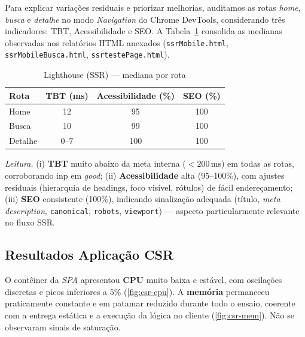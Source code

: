 {Para explicar variações residuais e priorizar melhorias, auditamos as rotas \emph{home}, \emph{busca} e \emph{detalhe} no modo \emph{Navigation} do Chrome DevTools, considerando três indicadores: TBT, Acessibilidade e SEO. A Tabela~\ref{tab:lh-ssr} consolida as medianas observadas nos relatórios HTML anexados (\texttt{ssrMobile.html}, \texttt{ssrMobileBusca.html}, \texttt{ssrtestePage.html}).

\begin{table}[H]
\centering
\caption{Lighthouse (SSR) — mediana por rota}
\label{tab:lh-ssr}
\begin{tabular}{|l|c|c|c|}
\hline
\textbf{Rota} & \textbf{TBT (ms)} & \textbf{Acessibilidade (\%)} & \textbf{SEO (\%)} \\
\hline
Home    & 12 & 95  & 100 \\
Busca   & 10 & 99  & 100 \\
Detalhe & 0--7\footnotemark[1] & 100 & 100 \\
\hline
\end{tabular}
\end{table}

\noindent \textit{Leitura.}
(i) \textbf{TBT} muito abaixo da meta interna ($<200$\,ms) em todas as rotas, corroborando \acrshort{inp} em \textit{good};
(ii) \textbf{Acessibilidade} alta (95--100\%), com ajustes residuais (hierarquia de headings, foco visível, rótulos) de fácil endereçamento;
(iii) \textbf{SEO} consistente (100\%), indicando sinalização adequada (título, \emph{meta description}, \texttt{canonical}, \texttt{robots}, \texttt{viewport}) — aspecto particularmente relevante no fluxo SSR.

\subsection{Resultados Aplicação CSR}
\label{subsec:resultados-csr}

O contêiner da \emph{SPA} apresentou \textbf{CPU} muito baixa e estável, com oscilações discretas e picos inferiores a 5\% (\autoref{fig:csr-cpu}). A \textbf{memória} permaneceu praticamente constante e em patamar reduzido durante todo o ensaio, coerente com a entrega estática e a execução da lógica no cliente (\autoref{fig:csr-mem}). Não se observaram sinais de saturação.

}
